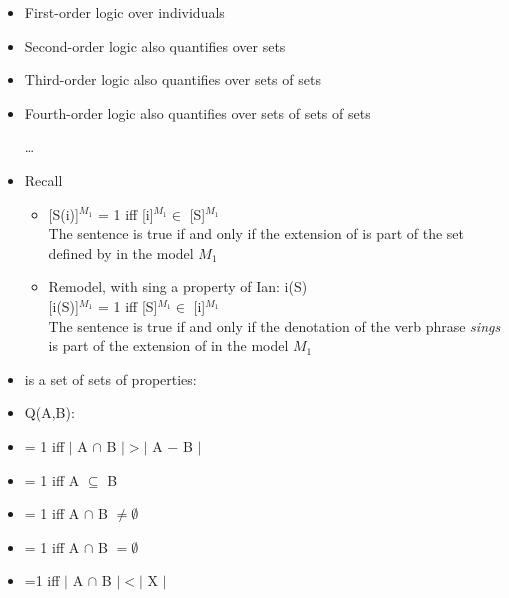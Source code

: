 \documentclass[headrule,footrule]{foils}
\begin{document}
\begin{itemize}
\item First-order logic over individuals
\item Second-order logic also quantifies over sets
\item Third-order logic also quantifies over sets of sets
\item Fourth-order logic also quantifies over sets of sets of sets
\item[\ldots{}]
\end{itemize}



 \begin{itemize}
\item Recall  
  \begin{itemize}
  \item {[S(i)]$^{M_1}$ = 1 iff [i]$^{M_1} \in$ [S]$^{M_1}$} \\ The
    sentence is true if and only if the extension of  is part of
    the set defined by  in the model $M_1$
  \item Remodel, with sing a property of Ian: i(S) \\ {[i(S)]$^{M_1}$
      = 1 iff [S]$^{M_1} \in$ [i]$^{M_1}$} \\ The sentence is true if
    and only if the denotation of the verb phrase \textit{sings} is
    part of the extension of   in the model $M_1$
  \end{itemize}
\item {} is a set of sets of properties: 
\end{itemize}

\begin{itemize}
\item Q(A,B): 
\item {} = 1 iff $|$ A $\cap$ B $| > |$ A $-$ B $|$ 
\item {} = 1 iff  A $\subseteq$ B  
\item {} = 1 iff  A $\cap$ B $\ne \emptyset$ 
\item {} = 1 iff A $\cap$ B  $= \emptyset$ 
\item {} =1 iff $|$ A $\cap$ B $| <  |$ X $|$ 
\end{itemize}
\end{document}
